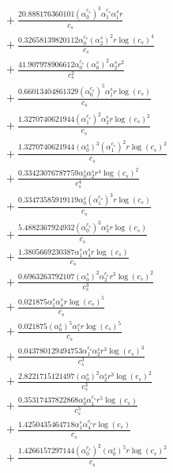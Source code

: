 \documentclass[10pt]{article}
\begin{document}
\begin{align*}
&{}  + \frac{20.888176360101 \left(\alpha_{0}^{c_s}\right)^{3} \alpha_{1}^{c_s} \alpha_{1}^s r}{c_{s}} \\
&{}  + \frac{0.32658139820112 \alpha_{0}^{c_s} \left(\alpha_{2}^s\right)^{2} r \log{\left(c_{s} \right)}^{4}}{c_{s}} \\
&{}  + \frac{41.907978906612 \alpha_{0}^{c_s} \left(\alpha_{0}^s\right)^{2} \alpha_{2}^s r^{2}}{c_{s}^{2}} \\
&{}  + \frac{0.66013404861329 \left(\alpha_{0}^{c_s}\right)^{5} \alpha_{1}^s r \log{\left(c_{s} \right)}}{c_{s}} \\
&{}  + \frac{1.3270740621944 \left(\alpha_{1}^{c_s}\right)^{2} \alpha_{2}^s r \log{\left(c_{s} \right)}^{2}}{c_{s}} \\
&{}  + \frac{1.3270740621944 \left(\alpha_{0}^s\right)^{3} \left(\alpha_{1}^{c_s}\right)^{2} r \log{\left(c_{s} \right)}^{2}}{c_{s}} \\
&{}  + \frac{0.33423076787759 \alpha_{0}^s \alpha_{2}^s r^{4} \log{\left(c_{s} \right)}^{2}}{c_{s}^{4}} \\
&{}  + \frac{0.33473585919119 \alpha_{0}^s \left(\alpha_{1}^{c_s}\right)^{3} r \log{\left(c_{s} \right)}}{c_{s}} \\
&{}  + \frac{5.4882367924932 \left(\alpha_{0}^{c_s}\right)^{3} \alpha_{3}^s r \log{\left(c_{s} \right)}}{c_{s}} \\
&{}  + \frac{1.3805669230387 \alpha_{1}^s \alpha_{4}^s r \log{\left(c_{s} \right)}}{c_{s}} \\
&{}  + \frac{0.6963263792107 \left(\alpha_{0}^s\right)^{2} \alpha_{2}^{c_s} r^{3} \log{\left(c_{s} \right)}^{2}}{c_{s}^{3}} \\
&{}  + \frac{0.021875 \alpha_{1}^s \alpha_{4}^s r \log{\left(c_{s} \right)}^{5}}{c_{s}} \\
&{}  + \frac{0.021875 \left(\alpha_{0}^s\right)^{5} \alpha_{1}^s r \log{\left(c_{s} \right)}^{5}}{c_{s}} \\
&{}  + \frac{0.043780129494753 \alpha_{1}^{c_s} \alpha_{2}^s r^{3} \log{\left(c_{s} \right)}^{3}}{c_{s}^{3}} \\
&{}  + \frac{2.8221715121497 \left(\alpha_{0}^s\right)^{2} \alpha_{2}^s r^{3} \log{\left(c_{s} \right)}^{2}}{c_{s}^{3}} \\
&{}  + \frac{0.35317437822868 \alpha_{0}^s \alpha_{1}^{c_s} r^{5} \log{\left(c_{s} \right)}}{c_{s}^{5}} \\
&{}  + \frac{1.4250435464718 \alpha_{1}^s \alpha_{4}^{c_s} r \log{\left(c_{s} \right)}}{c_{s}} \\
&{}  + \frac{1.4266157297144 \left(\alpha_{0}^{c_s}\right)^{2} \left(\alpha_{0}^s\right)^{5} r \log{\left(c_{s} \right)}^{2}}{c_{s}} \\

\end{align*}
\end{document}
